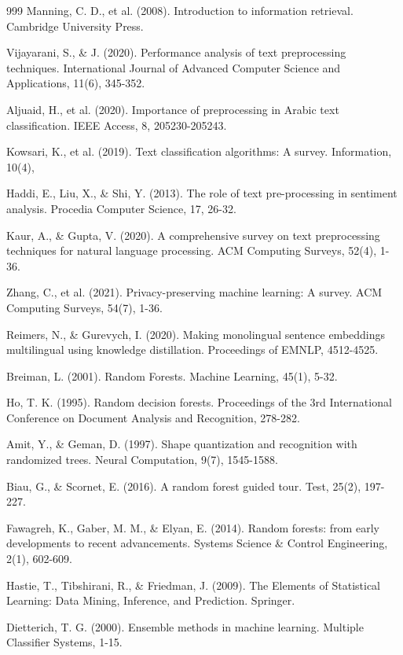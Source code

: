 \begin{thebibliography}{999}
 Manning, C. D., et al. (2008). Introduction to information retrieval. Cambridge University Press.

 Vijayarani, S., \& J. (2020). Performance analysis of text preprocessing techniques. International Journal of Advanced Computer Science and Applications, 11(6), 345-352.

 Aljuaid, H., et al. (2020). Importance of preprocessing in Arabic text classification. IEEE Access, 8, 205230-205243.

 Kowsari, K., et al. (2019). Text classification algorithms: A survey. Information, 10(4),

 Haddi, E., Liu, X., \& Shi, Y. (2013). The role of text pre-processing in sentiment analysis. Procedia Computer Science, 17, 26-32.

 Kaur, A., \& Gupta, V. (2020). A comprehensive survey on text preprocessing techniques for natural language processing. ACM Computing Surveys, 52(4), 1-36.

 Zhang, C., et al. (2021). Privacy-preserving machine learning: A survey. ACM Computing Surveys, 54(7), 1-36.

 Reimers, N., \& Gurevych, I. (2020). Making monolingual sentence embeddings multilingual using knowledge distillation. Proceedings of EMNLP, 4512-4525.

 Breiman, L. (2001). Random Forests. Machine Learning, 45(1), 5-32.

 Ho, T. K. (1995). Random decision forests. Proceedings of the 3rd International Conference on Document Analysis and Recognition, 278-282.

 Amit, Y., \& Geman, D. (1997). Shape quantization and recognition with randomized trees. Neural Computation, 9(7), 1545-1588.

 Biau, G., \& Scornet, E. (2016). A random forest guided tour. Test, 25(2), 197-227.

 Fawagreh, K., Gaber, M. M., \& Elyan, E. (2014). Random forests: from early developments to recent advancements. Systems Science \& Control Engineering, 2(1), 602-609.

 Hastie, T., Tibshirani, R., \& Friedman, J. (2009). The Elements of Statistical Learning: Data Mining, Inference, and Prediction. Springer.

 Dietterich, T. G. (2000). Ensemble methods in machine learning. Multiple Classifier Systems, 1-15.


\end{thebibliography}
